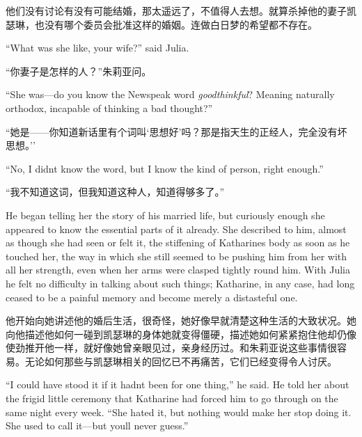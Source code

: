 \begin{paracol}{2}
\switchcolumn

他们没有讨论有没有可能结婚，那太遥远了，不值得人去想。就算杀掉他的妻子凯瑟琳，也没有哪个委员会批准这样的婚姻。连做白日梦的希望都不存在。

\switchcolumn*

``What was she like, your wife?'' said Julia.

\switchcolumn

``你妻子是怎样的人？''朱莉亚问。

\switchcolumn*

``She was---do you know the Newspeak word \emph{goodthinkful}? Meaning
naturally orthodox, incapable of thinking a bad thought?''

\switchcolumn

``她是——你知道新话里有个词叫`思想好'吗？那是指天生的正经人，完全没有坏思想。''

\switchcolumn*

``No, I didn\textquotesingle t know the word, but I know the kind of
person, right enough.''

\switchcolumn

``我不知道这词，但我知道这种人，知道得够多了。''

\switchcolumn*

He began telling her the story of his married life, but curiously enough
she appeared to know the essential parts of it already. She described to
him, almost as though she had seen or felt it, the stiffening of
Katharine\textquotesingle s body as soon as he touched her, the way in
which she still seemed to be pushing him from her with all her strength,
even when her arms were clasped tightly round him. With Julia he felt no
difficulty in talking about such things; Katharine, in any case, had
long ceased to be a painful memory and become merely a distasteful one.

\switchcolumn

他开始向她讲述他的婚后生活，很奇怪，她好像早就清楚这种生活的大致状况。她向他描述他如何一碰到凯瑟琳的身体她就变得僵硬，描述她如何紧紧抱住他却仍像使劲推开他一样，就好像她曾亲眼见过，亲身经历过。和朱莉亚说这些事情很容易。无论如何那些与凯瑟琳相关的回忆已不再痛苦，它们已经变得令人讨厌。

\switchcolumn*

``I could have stood it if it hadn\textquotesingle t been for one thing,''
he said. He told her about the frigid little ceremony that Katharine had
forced him to go through on the same night every week. ``She hated it,
but nothing would make her stop doing it. She used to call it---but
you\textquotesingle ll never guess.''


\end{paracol}
